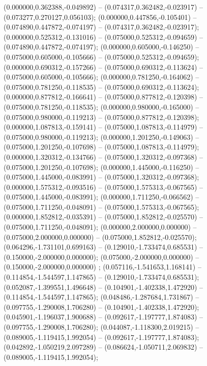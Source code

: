  (0.000000,0.362388,-0.049892) -- (0.074317,0.362482,-0.023917) -- (0.073277,0.270127,0.056103);
 (0.000000,0.447856,-0.105401) -- (0.074890,0.447872,-0.074197) -- (0.074317,0.362482,-0.023917);
 (0.000000,0.525312,-0.131016) -- (0.075000,0.525312,-0.094659) -- (0.074890,0.447872,-0.074197);
 (0.000000,0.605000,-0.146250) -- (0.075000,0.605000,-0.105666) -- (0.075000,0.525312,-0.094659);
 (0.000000,0.690312,-0.157266) -- (0.075000,0.690312,-0.113624) -- (0.075000,0.605000,-0.105666);
 (0.000000,0.781250,-0.164062) -- (0.075000,0.781250,-0.118535) -- (0.075000,0.690312,-0.113624);
 (0.000000,0.877812,-0.166641) -- (0.075000,0.877812,-0.120398) -- (0.075000,0.781250,-0.118535);
 (0.000000,0.980000,-0.165000) -- (0.075000,0.980000,-0.119213) -- (0.075000,0.877812,-0.120398);
 (0.000000,1.087813,-0.159141) -- (0.075000,1.087813,-0.114979) -- (0.075000,0.980000,-0.119213);
 (0.000000,1.201250,-0.149063) -- (0.075000,1.201250,-0.107698) -- (0.075000,1.087813,-0.114979);
 (0.000000,1.320312,-0.134766) -- (0.075000,1.320312,-0.097368) -- (0.075000,1.201250,-0.107698);
 (0.000000,1.445000,-0.116250) -- (0.075000,1.445000,-0.083991) -- (0.075000,1.320312,-0.097368);
 (0.000000,1.575312,-0.093516) -- (0.075000,1.575313,-0.067565) -- (0.075000,1.445000,-0.083991);
 (0.000000,1.711250,-0.066562) -- (0.075000,1.711250,-0.048091) -- (0.075000,1.575313,-0.067565);
 (0.000000,1.852812,-0.035391) -- (0.075000,1.852812,-0.025570) -- (0.075000,1.711250,-0.048091);
 (0.000000,2.000000,0.000000) -- (0.075000,2.000000,0.000000) -- (0.075000,1.852812,-0.025570);
 (0.064296,-1.731101,0.699163) -- (0.129010,-1.733474,0.685531) -- (0.150000,-2.000000,0.000000);
 (0.075000,-2.000000,0.000000) -- (0.150000,-2.000000,0.000000) ;
 (0.057116,-1.541653,1.168141) -- (0.114854,-1.544597,1.147865) -- (0.129010,-1.733474,0.685531);
 (0.052087,-1.399551,1.496648) -- (0.104901,-1.402338,1.472920) -- (0.114854,-1.544597,1.147865);
 (0.048486,-1.287684,1.731867) -- (0.097755,-1.290008,1.706280) -- (0.104901,-1.402338,1.472920);
 (0.045901,-1.196037,1.900688) -- (0.092617,-1.197777,1.874083) -- (0.097755,-1.290008,1.706280);
 (0.044087,-1.118300,2.019215) -- (0.089005,-1.119415,1.992054) -- (0.092617,-1.197777,1.874083);
 (0.042892,-1.050219,2.097289) -- (0.086624,-1.050711,2.069832) -- (0.089005,-1.119415,1.992054);
